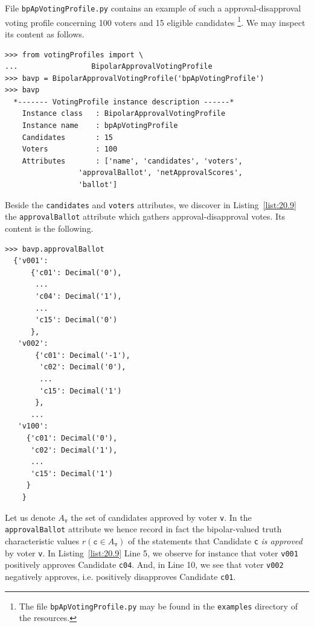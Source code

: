 File \texttt{bpApVotingProfile.py} contains an example of such a approval-disapproval voting profile concerning 100 voters and 15 eligible candidates \footnote{The file \texttt{bpApVotingProfile.py} may be found in the \texttt{examples} directory of the \Digraph resources.}. We may inspect its content as follows.
\begin{lstlisting}[caption={Bipolar approval vonting profiles},label=list:20.9]
>>> from votingProfiles import \
...                 BipolarApprovalVotingProfile
>>> bavp = BipolarApprovalVotingProfile('bpApVotingProfile')
>>> bavp
  *------- VotingProfile instance description ------*
    Instance class   : BipolarApprovalVotingProfile
    Instance name    : bpApVotingProfile
    Candidates       : 15
    Voters           : 100
    Attributes       : ['name', 'candidates', 'voters',
                 'approvalBallot', 'netApprovalScores',
                 'ballot']
\end{lstlisting}

Beside the \texttt{candidates} and \texttt{voters} attributes, we discover in Listing~\vref{list:20.9} the \texttt{approvalBallot} attribute which gathers approval-disapproval votes. Its content is the following.
\begin{lstlisting}[caption={Inspecting an approval-disapproval ballot},label=list:20.9]
>>> bavp.approvalBallot
  {'v001':
      {'c01': Decimal('0'),
       ...
       'c04': Decimal('1'),
       ...
       'c15': Decimal('0')
      },
   'v002':
       {'c01': Decimal('-1'),
        'c02': Decimal('0'),
        ...
        'c15': Decimal('1')
       },
      ...
   'v100':
     {'c01': Decimal('0'),
      'c02': Decimal('1'),
      ...
      'c15': Decimal('1')
     }
    }
\end{lstlisting}	

Let us denote $A_{\mathtt{v}}$ the set of candidates approved by voter \texttt{v}. In the \texttt{approvalBallot} attribute we hence record in fact the bipolar-valued truth characteristic values $r(\mathtt{c} \in A_{\mathtt{v}})$ of the statements that Candidate \texttt{c} \emph{is approved} by voter \texttt{v}. In Listing~\vref{list:20.9} Line 5, we observe for instance that voter \texttt{v001} positively approves Candidate \texttt{c04}. And, in Line 10, we see that voter \texttt{v002} negatively approves, i.e. positively disapproves Candidate \texttt{c01}.

